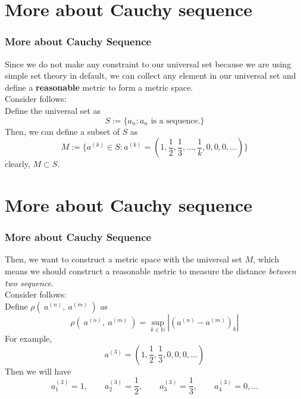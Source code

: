 \documentclass[12pt, t]{beamer}
\renewcommand{\emph}[1]{{\color{Turquoise3}\textsl{#1}}}
\begin{document}
\section{More about Cauchy sequence}
\begin{frame}
    \frametitle{More about Cauchy Sequence}

Since we do not make any constraint to our universal set because we are using simple set theory in default, we can collect any element in our universal set and define a 
\textbf{reasonable} metric to form a metric space.\\
\vspace{1em}
Consider follows:\\
\hspace{1em} Define the universal set as 
\begin{equation*}
    S:=\{a_n:a_n\text{ is a sequence.}\}
\end{equation*}
Then, we can define a subset of $S$ as
\begin{equation*}
    M:=\{a^{(k)}\in S:a^{(k)}=(1,\frac{1}{2},\frac{1}{3},\dots,\frac{1}{k},0,0,0,\dots)  \}
\end{equation*}
clearly, $M\subset S$. 

\end{frame}

\section{More about Cauchy sequence}
\begin{frame}
    \frametitle{More about Cauchy Sequence}
Then, we want to construct a metric space with the universal set $M$, which means we should construct a reasonable metric to measure the distance \emph{between two sequence}.\\
Consider follows:\\
\hspace{1em} Define $\rho(\ a^{(n)},\ a^{(m)}\ )$ as
\begin{equation*}
    \rho(\ a^{(n)},\ a^{(m)}\ )=\sup_{k\in \mathbb{N}}|(a^{(n)}-a^{(m)})_k|
\end{equation*}
For example, 
\begin{equation*}
    a^{(3)}=(1,\frac{1}{2},\frac{1}{3},0,0,0,\dots)
\end{equation*}
Then we will have 
\begin{equation*}
    a^{(3)}_1=1,\qquad a^{(3)}_2=\frac{1}{2},\qquad a^{(3)}_3=\frac{1}{3},\qquad a^{(3)}_4=0, \dots
\end{equation*}



\end{frame}
\end{document}
